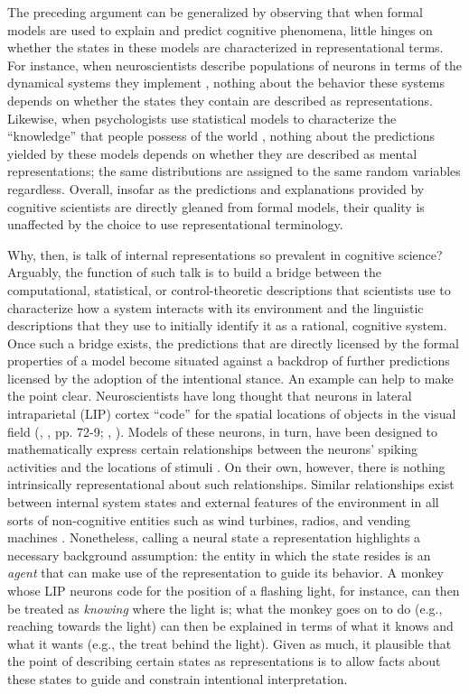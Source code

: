 The preceding argument can be generalized by observing that when formal models are used to explain and predict cognitive phenomena, little hinges on whether the states in these models are characterized in representational terms. For instance, when neuroscientists describe populations of neurons in terms of the dynamical systems they implement \citep[e.g., oscillators, point attractors, line attractors, etc.][]{EliasmithAnderson:2003}, nothing about the behavior these systems depends on whether the states they contain are described as representations. Likewise, when psychologists use statistical models to characterize the ``knowledge'' that people possess of the world \citep[e.g.,][]{Goodman:2015}, nothing about the predictions yielded by these models depends on whether they are described as mental representations; the same distributions are assigned to the same random variables regardless. Overall, insofar as the predictions and explanations provided by cognitive scientists are directly gleaned from formal models, their quality is unaffected by the choice to use representational terminology.

Why, then, is talk of internal representations so prevalent in cognitive science? Arguably, the function of such talk is to build a bridge between the computational, statistical, or control-theoretic descriptions that scientists use to characterize how a system interacts with its environment and the linguistic descriptions that they use to initially identify it as a rational, cognitive system. Once such a bridge exists, the predictions that are directly licensed by the formal properties of a model become situated against a backdrop of further predictions licensed by the adoption of the intentional stance. An example can help to make the point clear. Neuroscientists have long thought that neurons in lateral intraparietal (LIP) cortex ``code'' for the spatial locations of objects in the visual field (\citeauthor{EliasmithAnderson:2003}, \citeyear{EliasmithAnderson:2003}, pp. 72-9; \citeauthor{Andersen:1985}, \citeyear{Andersen:1985}). Models of these neurons, in turn, have been designed to mathematically express certain relationships between the neurons' spiking activities and the locations of stimuli \citep{EliasmithAnderson:2003}. On their own, however, there is nothing intrinsically representational about such relationships. Similar relationships exist between internal system states and external features of the environment in all sorts of non-cognitive entities such as wind turbines, radios, and vending machines \citep{Dennett:1987}. Nonetheless, calling a neural state a representation highlights a necessary background assumption: the entity in which the state resides is an \textit{agent} that can make use of the representation to guide its behavior. A monkey whose LIP neurons code for the position of a flashing light, for instance, can then be treated as \textit{knowing} where the light is; what the monkey goes on to do (e.g., reaching towards the light) can then be explained in terms of what it knows and what it wants (e.g., the treat behind the light). Given as much, it plausible that the point of describing certain states as representations is to allow facts about these states to guide and constrain intentional interpretation. 

